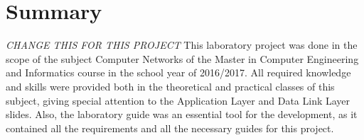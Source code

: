 \documentclass[a4paper]{article}
\begin{document}
\maketitle
\thispagestyle{empty}


\newpage

%
%
%
%
%
%
%



\section{Summary}

\textit{CHANGE THIS FOR THIS PROJECT}
This laboratory project was done in the scope of the subject Computer Networks of the Master in Computer Engineering and Informatics course in the school year of 2016/2017. All required knowledge and skills were provided both in the theoretical and practical classes of this subject, giving special attention to the Application Layer and Data Link Layer slides. Also, the laboratory guide was an essential tool for the development, as it contained all the requirements and all the necessary guides for this project.
\end{document}
